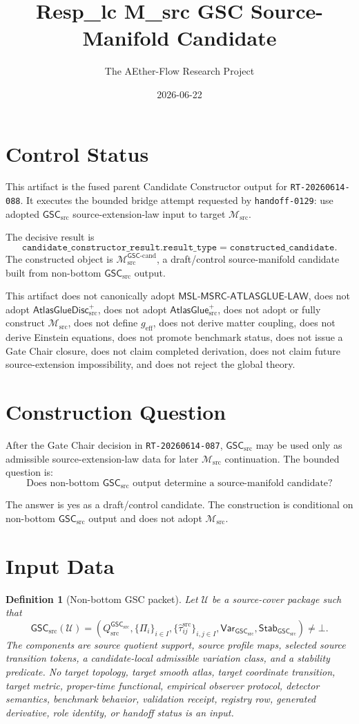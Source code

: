 \documentclass[11pt]{article}
\title{Resp\_lc M\_src GSC Source-Manifold Candidate}
\author{The AEther-Flow Research Project}
\date{2026-06-22}
\newcommand{\Msrc}{\mathcal{M}_{\mathrm{src}}}
\newcommand{\Mgsccand}{\mathcal{M}_{\mathrm{src}}^{\mathsf{GSC}\text{-}\mathrm{cand}}}
\newcommand{\geff}{g_{\mathrm{eff}}}
\newcommand{\GSC}{\mathsf{GSC}_{\mathrm{src}}}
\newcommand{\Vargsc}{\mathsf{Var}_{\GSC}}
\newcommand{\Stabgsc}{\mathsf{Stab}_{\GSC}}
\newcommand{\Qsrc}{Q_{\mathrm{src}}^{\GSC}}
\newcommand{\Tau}{\widehat{\tau}^{\mathrm{src}}}
\newcommand{\Bot}{\bot}
\newcommand{\MSL}{\mathsf{MSL}\mbox{-}\mathsf{MSRC}\mbox{-}\mathsf{ATLASGLUE}\mbox{-}\mathsf{LAW}}
\newcommand{\AtlasGlue}{\mathsf{AtlasGlue}_{\mathrm{src}}^{+}}
\newcommand{\AtlasGlueDisc}{\mathsf{AtlasGlueDisc}_{\mathrm{src}}^{+}}
\newtheorem{definition}{Definition}
\begin{document}
\maketitle

\section*{Control Status}

This artifact is the fused parent Candidate Constructor output for
\texttt{RT-20260614-088}. It executes the bounded bridge attempt requested by
\texttt{handoff-0129}: use adopted \(\GSC\) source-extension-law input to
target \(\Msrc\).

The decisive result is
\[
  \texttt{candidate\_constructor\_result.result\_type}
  = \texttt{constructed\_candidate}.
\]
The constructed object is \(\Mgsccand\), a draft/control source-manifold
candidate built from non-bottom \(\GSC\) output.

This artifact does not canonically adopt \(\MSL\), does not adopt
\(\AtlasGlueDisc\), does not adopt \(\AtlasGlue\), does not adopt or fully
construct \(\Msrc\), does not define \(\geff\), does not derive matter
coupling, does not derive Einstein equations, does not promote benchmark
status, does not issue a Gate Chair closure, does not claim completed
derivation, does not claim future source-extension impossibility, and does
not reject the global theory.

\section{Construction Question}

After the Gate Chair decision in \texttt{RT-20260614-087}, \(\GSC\) may be
used only as admissible source-extension-law data for later \(\Msrc\)
continuation. The bounded question is:
\[
  \text{Does non-bottom }\GSC\text{ output determine a source-manifold
  candidate?}
\]

The answer is yes as a draft/control candidate. The construction is
conditional on non-bottom \(\GSC\) output and does not adopt \(\Msrc\).

\section{Input Data}

\begin{definition}[Non-bottom GSC packet]
Let \(\mathcal U\) be a source-cover package such that
\[
  \GSC(\mathcal U)
  =(\Qsrc,\{\Pi_i\}_{i\in I},\{\Tau_{ij}\}_{i,j\in I},
    \Vargsc,\Stabgsc)
  \neq \Bot .
\]
The components are source quotient support, source profile maps, selected
source transition tokens, a candidate-local admissible variation class, and a
stability predicate. No target topology, target smooth atlas, target
coordinate transition, target metric, proper-time functional, empirical
observer protocol, detector semantics, benchmark behavior, validation
receipt, registry row, generated derivative, role identity, or handoff status
is an input.
\end{definition}
\end{document}
